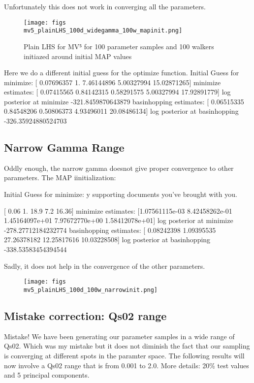 \documentclass{article}
\begin{document}
Unfortunately this does not work in converging all the parameters. 

\begin{figure}
\centering
\texttt{[image: figs\\mv5\_plainLHS\_100d\_widegamma\_100w\_mapinit.png]}
\caption{Plain LHS for MV⁵ for 100 parameter samples and 100 walkers initiazed around initial MAP values}
\end{figure}


Here we do a different initial guess for the optimize function.
Initial Guess for minimize:  [ 0.07696357  1.          7.46144896  5.00327994 15.02871265]
minimize estimates:  [ 0.07415565  0.84142315  0.58291575  5.00327994 17.92891779]
log posterior at minimize -321.8459870643879
basinhopping estimates:  [ 0.06515335  0.84548206  0.50806373  4.93496011 20.08486134]
log posterior at basinhopping -326.35924880524703


\subsection{Narrow Gamma Range}

Oddly enough, the narrow gamma doesnot give proper convergence to other parameters. The MAP iinitialization:

Initial Guess for minimize:  y supporting documents you’ve brought with you.

[ 0.06  1.   18.9   7.2  16.36]
minimize estimates:  [1.07561115e-03 8.42458262e-01 1.45164097e+01 7.97672770e+00  1.58412078e+01]
log posterior at minimize -278.27712184232774
basinhopping estimates:  [ 0.08242398  1.09395535 27.26378182 12.25817616 10.03228508]
log posterior at basinhopping -338.53583454394544

Sadly, it does not help in the convergence of the other parameters.

\begin{figure}
\centering
\texttt{[image: figs\\mv5\_plainLHS\_100d\_100w\_narrowinit.png]}
\end{figure}

\subsection{Mistake correction: Qs02 range}
Mistake! We have been generating our parameter samples in a wide range of Qs02. Which was my mistake but it does not diminish the fact that our sampling is converging at different spots in the paramter space. The following results will now involve a Qs02 range that is from 0.001 to 2.0. More details: 20\% test values and 5 principal components.
\end{document}
